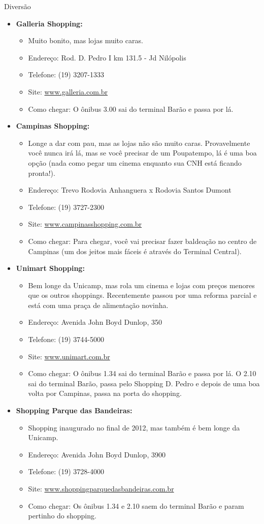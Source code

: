 \begin{story}{Diversão}
\begin{itemize}
\begin{itemize}
\item \textbf{Galleria Shopping:}
\begin{itemize}
\item Muito bonito, mas lojas muito caras.
\item Endereço: Rod. D. Pedro I km 131.5 - Jd Nilópolis
\item Telefone: (19) 3207-1333
\item Site: \url{www.galleria.com.br}
\item Como chegar: O ônibus 3.00 sai do terminal Barão e passa por lá.
\end{itemize}

\item \textbf{Campinas Shopping:}
\begin{itemize}
\item Longe a dar com pau, mas as lojas não são muito caras. Provavelmente você nunca irá lá, mas se você precisar de um Poupatempo, lá é uma boa opção (nada como pegar um cinema enquanto sua CNH está ficando pronta!).
\item Endereço: Trevo Rodovia Anhanguera x Rodovia Santos Dumont
\item Telefone: (19) 3727-2300
\item Site: \url{www.campinasshopping.com.br}
\item Como chegar: Para chegar, você vai precisar fazer baldeação no centro de Campinas (um dos jeitos mais fáceis é através do Terminal Central).
\end{itemize}

\item \textbf{Unimart Shopping:}
\begin{itemize}
\item Bem longe da Unicamp, mas rola um cinema e lojas com preços menores que os outros shoppings. Recentemente passou por uma reforma parcial e está com uma praça de alimentação novinha.
\item Endereço: Avenida John Boyd Dunlop, 350
\item Telefone: (19) 3744-5000
\item Site: \url{www.unimart.com.br}
\item Como chegar: O ônibus 1.34 sai do terminal Barão e passa por lá. O 2.10 sai do terminal Barão, passa pelo Shopping D. Pedro e depois de uma boa volta por Campinas, passa na porta do shopping.
\end{itemize}

\item \textbf{Shopping Parque das Bandeiras:}
\begin{itemize}
\item Shopping inaugurado no final de 2012, mas também é bem longe da Unicamp.
\item Endereço: Avenida John Boyd Dunlop, 3900
\item Telefone: (19) 3728-4000
\item Site: \url{www.shoppingparquedasbandeiras.com.br}
\item Como chegar: Os ônibus 1.34 e 2.10 saem do terminal Barão e param pertinho do shopping.
\end{itemize}


\end{itemize}
\end{itemize}
\end{story}
